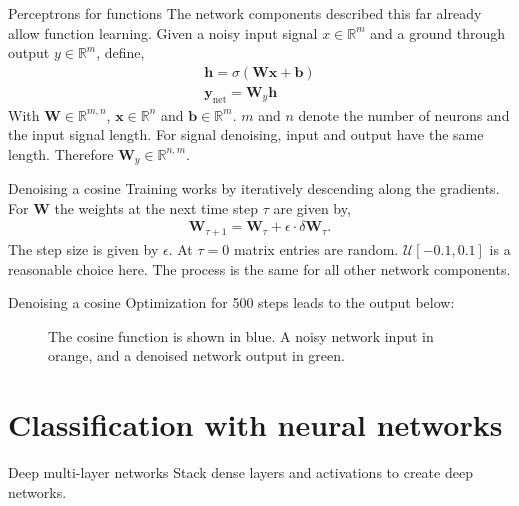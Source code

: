 \documentclass[notes]{beamer}
\begin{document}
    \begin{frame}{Perceptrons for functions}
      The network components described this far already allow function learning.
      Given a noisy input signal $x \in \mathbb{R}^{m}$ and a ground through output $y \in \mathbb{R}^m$,
      define,
      \begin{align}
        \mathbf{h} = \sigma(\mathbf{W}\mathbf{x} + \mathbf{b}) \\
        \mathbf{y}_{\text{net}} = \mathbf{W}_y\mathbf{h}
      \end{align}
      With $\mathbf{W} \in \mathbb{R}^{m,n}$, $\mathbf{x} \in \mathbb{R}^{n}$ and $\mathbf{b} \in \mathbb{R}^{m}$.
      $m$ and $n$ denote the number of neurons and the input signal length.
      For signal denoising, input and output have the same length. Therefore $\mathbf{W}_y \in \mathbb{R}^{n,m}$.
    \end{frame}

    \begin{frame}{Denoising a cosine}
      Training works by iteratively descending along the gradients. For $\mathbf{W}$ the weights at the
      next time step $\tau$ are given by,
      \begin{align}
        \mathbf{W}_{\tau + 1} = \mathbf{W}_\tau + \epsilon \cdot \delta\mathbf{W}_{\tau}.
      \end{align}
      The step size is given by $\epsilon$. At $\tau = 0$ matrix entries are random.
      $\mathcal{U}[-0.1, 0.1]$ is a reasonable choice here.
      The process is the same for all other network components.
    \end{frame}


    \begin{frame}{Denoising a cosine}
      Optimization for 500 steps leads to the output below:
      \begin{figure}
        
        \caption{The cosine function is shown in blue. A noisy network input in orange, and a denoised network output in green.}
        \end{figure}
    \end{frame}


    \section{Classification with neural networks}

    \begin{frame}{Deep multi-layer networks}
      Stack dense layers and activations to create deep networks. \\
      \begin{figure}
         
      \end{figure}
    \end{frame}
\end{document}
